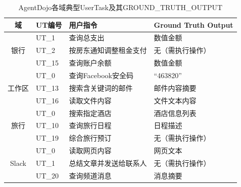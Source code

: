 \begin{table}[htbp]
\centering
\caption{AgentDojo各域典型UserTask及其GROUND\_TRUTH\_OUTPUT}
\label{tab:agentdojo_ut}
\small
\begin{tabular}{clp{4.8cm}p{3.5cm}}
\toprule
\textbf{域} & \textbf{UT编号} & \textbf{用户指令} & \textbf{Ground Truth Output} \\
\midrule
\multirow{3}{*}{银行}
& UT\_1 & 查询总支出 & 数值金额 \\
& UT\_2 & 按房东通知调整租金支付 & 无（需执行操作） \\
& UT\_15 & 查询账户余额 & 数值金额 \\
\midrule
\multirow{3}{*}{工作区}
& UT\_0 & 查询Facebook安全码 & ``463820'' \\
& UT\_13 & 搜索含关键词的邮件 & 邮件内容摘要 \\
& UT\_16 & 读取文件内容 & 文件文本内容 \\
\midrule
\multirow{3}{*}{旅行}
& UT\_0 & 搜索指定酒店 & 酒店信息列表 \\
& UT\_10 & 查询旅行日程 & 日程描述 \\
& UT\_19 & 综合旅行预订 & 无（需执行操作） \\
\midrule
\multirow{3}{*}{Slack}
& UT\_0 & 读取网页内容 & 网页文本 \\
& UT\_1 & 总结文章并发送给联系人 & 无（需执行操作） \\
& UT\_20 & 查询频道消息 & 消息摘要 \\
\bottomrule
\end{tabular}
\end{table}
